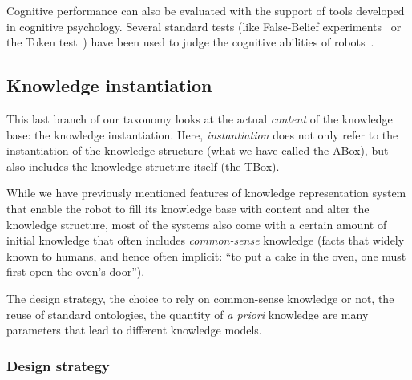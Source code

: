 Cognitive performance can also be evaluated with the support of tools developed
in cognitive psychology. Several standard tests (like False-Belief
experiments~\cite{Leslie2000} or the Token test~\cite{DiSimoni1978}) have been
used to judge the cognitive abilities of robots~\cite{Mavridis2006,
Breazeal2006}.
\subsection{Knowledge instantiation}

\begin{scriptsize}
\begin{center}
\end{center}
\end{scriptsize}

This last branch of our taxonomy looks at the actual \emph{content} of the
knowledge base: the knowledge instantiation. Here, \emph{instantiation} does
not only refer to the instantiation of the knowledge structure (what we have
called the ABox), but also includes the knowledge structure itself (the TBox).

While we have previously mentioned features of knowledge representation system
that enable the robot to fill its knowledge base with content and alter the
knowledge structure, most of the systems also come with a certain amount of
initial knowledge that often includes \emph{common-sense} knowledge (\ie facts
that widely known to humans, and hence often implicit: ``to put a cake in the
oven, one must first open the oven's door'').

The design strategy, the choice to rely on common-sense knowledge or not, the
reuse of standard ontologies, the quantity of {\it a priori} knowledge are many
parameters that lead to different knowledge models.


\subsubsection{Design strategy}
\label{sect|design-strategies}

